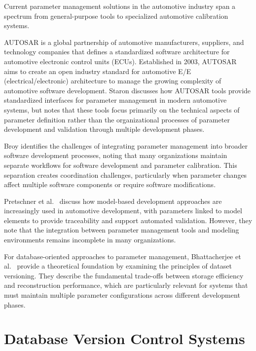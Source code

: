 Current parameter management solutions in the automotive industry span a spectrum from general-purpose tools to specialized automotive calibration systems. 

\ac{AUTOSAR} is a global partnership of automotive manufacturers, suppliers, and technology companies that defines a standardized software architecture for automotive electronic control units (ECUs). Established in 2003, AUTOSAR aims to create an open industry standard for automotive E/E (electrical/electronic) architecture to manage the growing complexity of automotive software development. Staron \cite{staron2021automotive} discusses how AUTOSAR tools provide standardized interfaces for parameter management in modern automotive systems, but notes that these tools focus primarily on the technical aspects of parameter definition rather than the organizational processes of parameter development and validation through multiple development phases.

Broy \cite{broy2006challenges} identifies the challenges of integrating parameter management into broader software development processes, noting that many organizations maintain separate workflows for software development and parameter calibration. This separation creates coordination challenges, particularly when parameter changes affect multiple software components or require software modifications.

Pretschner et al.\ \cite{pretschner2007software} discuss how model-based development approaches are increasingly used in automotive development, with parameters linked to model elements to provide traceability and support automated validation. However, they note that the integration between parameter management tools and modeling environments remains incomplete in many organizations.

For database-oriented approaches to parameter management, Bhattacherjee et al.\ \cite{bhattacherjee2015principles} provide a theoretical foundation by examining the principles of dataset versioning. They describe the fundamental trade-offs between storage efficiency and reconstruction performance, which are particularly relevant for systems that must maintain multiple parameter configurations across different development phases.

\section{Database Version Control Systems}
\label{sec:database-version-control}

